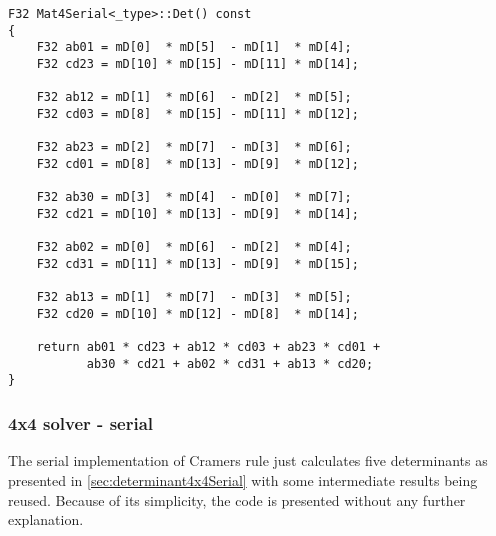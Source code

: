 \begin{verbatim}
F32 Mat4Serial<_type>::Det() const
{
    F32 ab01 = mD[0]  * mD[5]  - mD[1]  * mD[4];
    F32 cd23 = mD[10] * mD[15] - mD[11] * mD[14];

    F32 ab12 = mD[1]  * mD[6]  - mD[2]  * mD[5];
    F32 cd03 = mD[8]  * mD[15] - mD[11] * mD[12];

    F32 ab23 = mD[2]  * mD[7]  - mD[3]  * mD[6];
    F32 cd01 = mD[8]  * mD[13] - mD[9]  * mD[12];

    F32 ab30 = mD[3]  * mD[4]  - mD[0]  * mD[7];
    F32 cd21 = mD[10] * mD[13] - mD[9]  * mD[14];

    F32 ab02 = mD[0]  * mD[6]  - mD[2]  * mD[4];
    F32 cd31 = mD[11] * mD[13] - mD[9]  * mD[15];

    F32 ab13 = mD[1]  * mD[7]  - mD[3]  * mD[5];
    F32 cd20 = mD[10] * mD[12] - mD[8]  * mD[14];

    return ab01 * cd23 + ab12 * cd03 + ab23 * cd01 + 
           ab30 * cd21 + ab02 * cd31 + ab13 * cd20;
}
\end{verbatim}





\newpage
\subsubsection{4x4 solver - serial}
\label{sec:cramerSolver4x4Serial}

The serial implementation of Cramers rule just calculates five determinants as presented in \cref{sec:determinant4x4Serial} with some intermediate results being reused.
Because of its simplicity, the code is presented without any further explanation.

